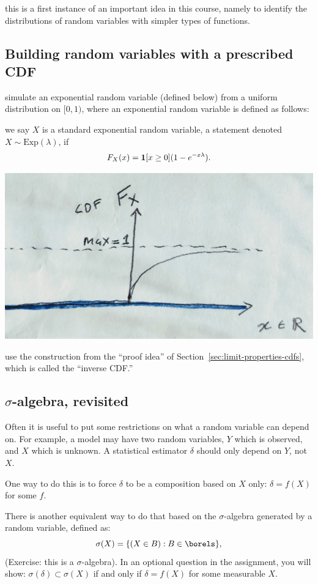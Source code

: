 \documentclass{article}
\begin{document}
 this is a first instance of an important idea in this course, namely to identify the distributions of random variables with simpler types of functions.


\subsection{Building random variables with a prescribed CDF}\label{sec:inverse-cdf}

 simulate an exponential random variable (defined below) from a uniform distribution on $[0, 1)$, where an exponential random variable is defined as follows:

 we say $X$ is a standard exponential random variable, a statement denoted $X \sim \text{Exp}(\lambda)$, if \[F_X(x) = {\mathbf 1}[x \ge 0] (1 - e^{-x \lambda}). \]
\begin{center}
	\includegraphics[width=0.4\linewidth]{figures/cdf-exp}
\end{center}

 use the construction from the ``proof idea'' of Section~\ref{sec:limit-properties-cdfs}, which is called the ``inverse CDF.''


\subsection{$\sigma$-algebra, revisited}\label{sec:sigma-alg-and-estimator}

Often it is useful to put some restrictions on what a random variable can depend on. For example, a model may have two random variables, $Y$ which is observed, and $X$ which is unknown. A statistical estimator $\delta$ should only depend on $Y$, not $X$. 

One way to do this is to force $\delta$ to be a composition based on $X$ only: $\delta = f(X)$ for some $f$. 

There is another equivalent way to do that based on the $\sigma$-algebra generated by a random variable, defined as:
\[ \sigma(X) = \{ (X \in B) : B \in \borels\}, \]
(Exercise: this is a $\sigma$-algebra). 
In an optional question in the assignment, you will show: $\sigma(\delta) \subset \sigma(X)$ if and only if $\delta = f(X)$ for some measurable $X$.
\end{document}

